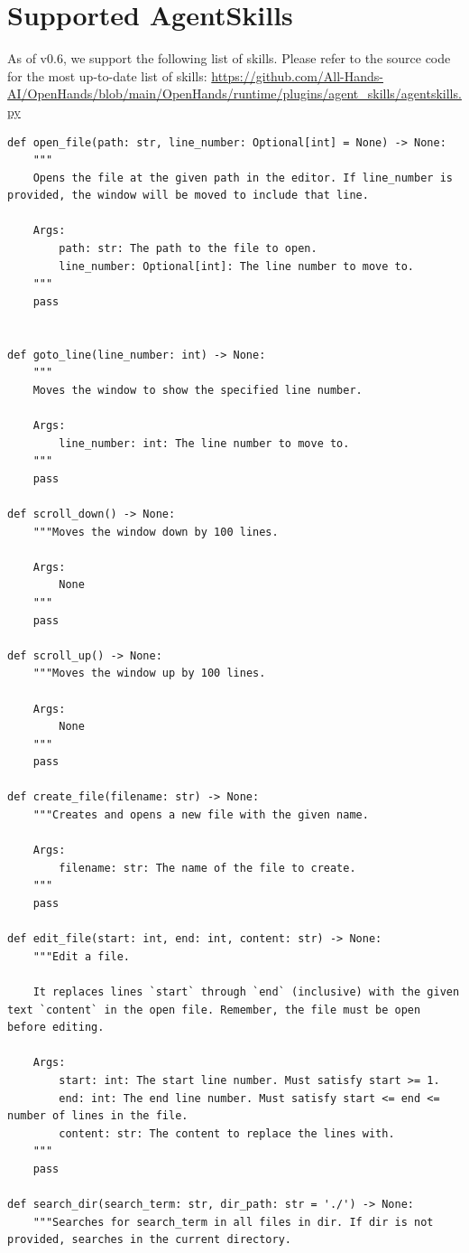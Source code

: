 \section{Supported AgentSkills}
\label{sec:supported-agentskills}

As of \projname v0.6, we support the following list of skills.
Please refer to the source code for the most up-to-date list of skills: \url{https://github.com/All-Hands-AI/OpenHands/blob/main/OpenHands/runtime/plugins/agent_skills/agentskills.py}


\begin{verbatim}
def open_file(path: str, line_number: Optional[int] = None) -> None:
    """
    Opens the file at the given path in the editor. If line_number is provided, the window will be moved to include that line.

    Args:
        path: str: The path to the file to open.
        line_number: Optional[int]: The line number to move to.
    """
    pass


def goto_line(line_number: int) -> None:
    """
    Moves the window to show the specified line number.

    Args:
        line_number: int: The line number to move to.
    """
    pass

def scroll_down() -> None:
    """Moves the window down by 100 lines.

    Args:
        None
    """
    pass

def scroll_up() -> None:
    """Moves the window up by 100 lines.

    Args:
        None
    """
    pass

def create_file(filename: str) -> None:
    """Creates and opens a new file with the given name.

    Args:
        filename: str: The name of the file to create.
    """
    pass

def edit_file(start: int, end: int, content: str) -> None:
    """Edit a file.

    It replaces lines `start` through `end` (inclusive) with the given text `content` in the open file. Remember, the file must be open before editing.

    Args:
        start: int: The start line number. Must satisfy start >= 1.
        end: int: The end line number. Must satisfy start <= end <= number of lines in the file.
        content: str: The content to replace the lines with.
    """
    pass

def search_dir(search_term: str, dir_path: str = './') -> None:
    """Searches for search_term in all files in dir. If dir is not provided, searches in the current directory.


\end{verbatim}
